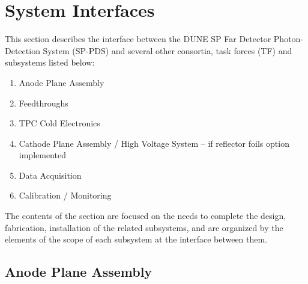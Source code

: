 \section{System Interfaces}
\label{sec:fdsp-pd-intfc}



This section describes the interface between the DUNE SP Far Detector Photon-Detection System (SP-PDS) and several other consortia, task forces (TF) and subsystems listed below:

\begin{enumerate}
\item Anode Plane Assembly
\item{Feedthroughs}
\item TPC Cold Electronics 
\item{Cathode Plane Assembly / High Voltage System -- if reflector foils option implemented}
\item Data Acquisition
\item Calibration / Monitoring
\end{enumerate}

The contents of the section are focused on the needs to complete the design, fabrication, installation of the related subsystems, and are organized by the elements of the scope of each subsystem at the interface between them.


\subsection{Anode Plane Assembly}
\label{sec:fdsp-pd-intfc-apa}



